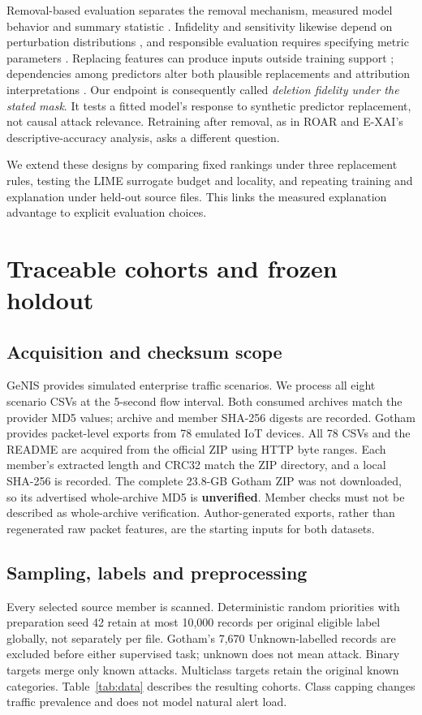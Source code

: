 \documentclass[conference,letterpaper]{IEEEtran}
\begin{document}
Removal-based evaluation separates the removal mechanism, measured model behavior and summary statistic \cite{covert}. Infidelity and sensitivity likewise depend on perturbation distributions \cite{yeh}, and responsible evaluation requires specifying metric parameters \cite{quantus}. Replacing features can produce inputs outside training support \cite{hase}; dependencies among predictors alter both plausible replacements and attribution interpretations \cite{aas}. Our endpoint is consequently called \emph{deletion fidelity under the stated mask}. It tests a fitted model's response to synthetic predictor replacement, not causal attack relevance. Retraining after removal, as in ROAR \cite{hooker} and E-XAI's descriptive-accuracy analysis, asks a different question.

We extend these designs by comparing fixed rankings under three replacement rules, testing the LIME surrogate budget and locality, and repeating training and explanation under held-out source files. This links the measured explanation advantage to explicit evaluation choices.

\section{Traceable cohorts and frozen holdout}
\subsection{Acquisition and checksum scope}
GeNIS provides simulated enterprise traffic scenarios. We process all eight scenario CSVs at the 5-second flow interval. Both consumed archives match the provider MD5 values; archive and member SHA-256 digests are recorded. Gotham provides packet-level exports from 78 emulated IoT devices. All 78 CSVs and the README are acquired from the official ZIP using HTTP byte ranges. Each member's extracted length and CRC32 match the ZIP directory, and a local SHA-256 is recorded. The complete 23.8-GB Gotham ZIP was not downloaded, so its advertised whole-archive MD5 is \textbf{unverified}. Member checks must not be described as whole-archive verification. Author-generated exports, rather than regenerated raw packet features, are the starting inputs for both datasets.

\subsection{Sampling, labels and preprocessing}
Every selected source member is scanned. Deterministic random priorities with preparation seed 42 retain at most 10,000 records per original eligible label globally, not separately per file. Gotham's 7,670 Unknown-labelled records are excluded before either supervised task; unknown does not mean attack. Binary targets merge only known attacks. Multiclass targets retain the original known categories. Table~\ref{tab:data} describes the resulting cohorts. Class capping changes traffic prevalence and does not model natural alert load.
\end{document}
